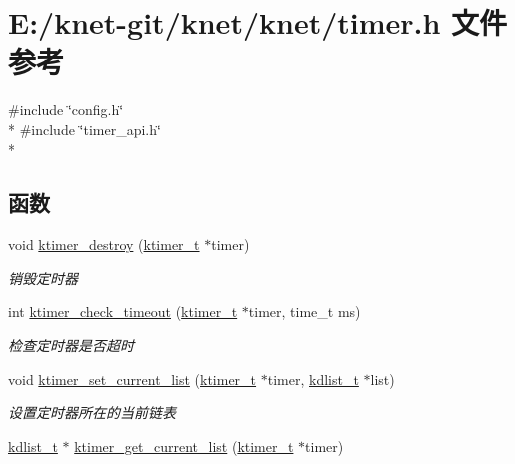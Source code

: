 \hypertarget{a00101}{}\section{E\+:/knet-\/git/knet/knet/timer.h 文件参考}
\label{a00101}
{\ttfamily \#include \char`\"{}config.\+h\char`\"{}}\\*
{\ttfamily \#include \char`\"{}timer\+\_\+api.\+h\char`\"{}}\\*
\subsection*{函数}
\begin{DoxyCompactItemize}
\item 
void \hyperlink{a00101_af64f93b32c31cd222c02f0ad40bb642c_af64f93b32c31cd222c02f0ad40bb642c}{ktimer\+\_\+destroy} (\hyperlink{a00054_a846172ea4e8a86449eca41a3d8e074b7_a846172ea4e8a86449eca41a3d8e074b7}{ktimer\+\_\+t} $\ast$timer)
\begin{DoxyCompactList}\small\item\em 销毁定时器 \end{DoxyCompactList}\item 
int \hyperlink{a00101_a6e263963404ff40c8d7865ba117d3446_a6e263963404ff40c8d7865ba117d3446}{ktimer\+\_\+check\+\_\+timeout} (\hyperlink{a00054_a846172ea4e8a86449eca41a3d8e074b7_a846172ea4e8a86449eca41a3d8e074b7}{ktimer\+\_\+t} $\ast$timer, time\+\_\+t ms)
\begin{DoxyCompactList}\small\item\em 检查定时器是否超时 \end{DoxyCompactList}\item 
void \hyperlink{a00101_a03cfe3f98b0537ccb1aba830ccee3991_a03cfe3f98b0537ccb1aba830ccee3991}{ktimer\+\_\+set\+\_\+current\+\_\+list} (\hyperlink{a00054_a846172ea4e8a86449eca41a3d8e074b7_a846172ea4e8a86449eca41a3d8e074b7}{ktimer\+\_\+t} $\ast$timer, \hyperlink{a00054_ae098586334a621a23cef7cb17590b618_ae098586334a621a23cef7cb17590b618}{kdlist\+\_\+t} $\ast$list)
\begin{DoxyCompactList}\small\item\em 设置定时器所在的当前链表 \end{DoxyCompactList}\item 
\hyperlink{a00054_ae098586334a621a23cef7cb17590b618_ae098586334a621a23cef7cb17590b618}{kdlist\+\_\+t} $\ast$ \hyperlink{a00101_a189b9239e148c4eeec1ec910261a3389_a189b9239e148c4eeec1ec910261a3389}{ktimer\+\_\+get\+\_\+current\+\_\+list} (\hyperlink{a00054_a846172ea4e8a86449eca41a3d8e074b7_a846172ea4e8a86449eca41a3d8e074b7}{ktimer\+\_\+t} $\ast$timer)

\end{DoxyCompactItemize}

